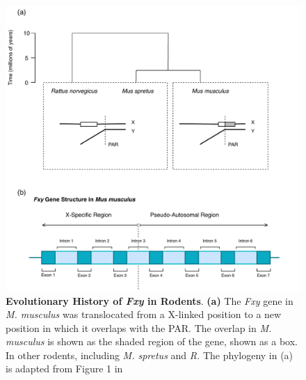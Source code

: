 \begin{figure}[htbp]
\centering
\includegraphics[width=\textwidth]{figures/diagrams/Fxy.pdf}
\caption{\textbf{Evolutionary History of \textit{Fxy} in Rodents}. \textbf{(a)} The \textit{Fxy} gene in \textit{M. musculus} was translocated from a X-linked position to a new position in which it overlaps with the PAR. The overlap in \textit{M. musculus} is shown as the shaded region of the gene, shown as a box. In other rodents, including \textit{M. spretus} and \textit{R. } The phylogeny in (a) is adapted from Figure 1 in \cite{Galtier2007AdaptationEvolution}}
\label{fig:Fxy}
\end{figure}